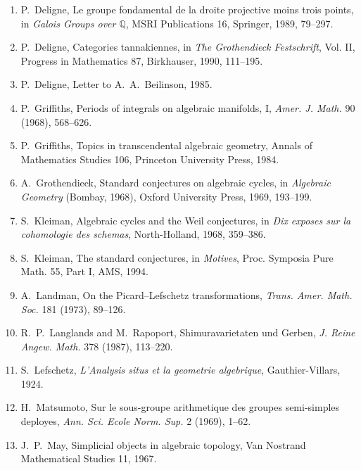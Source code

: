 \documentclass[11pt,a4paper]{article}
\theoremstyle{plain}
\theoremstyle{definition}
\newcommand{\Q}{\mathbb{Q}}
\begin{document}
\begin{enumerate}
\item[{[14]}] P.~Deligne, Le groupe fondamental de la droite projective moins trois points, in \textit{Galois Groups over $\Q$}, MSRI Publications 16, Springer, 1989, 79--297.

\item[{[15]}] P.~Deligne, Categories tannakiennes, in \textit{The Grothendieck Festschrift}, Vol. II, Progress in Mathematics 87, Birkhauser, 1990, 111--195.

\item[{[16]}] P.~Deligne, Letter to A.~A.~Beilinson, 1985.

\item[{[17]}] P.~Griffiths, Periods of integrals on algebraic manifolds, I, \textit{Amer. J. Math.} 90 (1968), 568--626.

\item[{[18]}] P.~Griffiths, Topics in transcendental algebraic geometry, Annals of Mathematics Studies 106, Princeton University Press, 1984.

\item[{[19]}] A.~Grothendieck, Standard conjectures on algebraic cycles, in \textit{Algebraic Geometry} (Bombay, 1968), Oxford University Press, 1969, 193--199.

\item[{[20]}] S.~Kleiman, Algebraic cycles and the Weil conjectures, in \textit{Dix exposes sur la cohomologie des schemas}, North-Holland, 1968, 359--386.

\item[{[21]}] S.~Kleiman, The standard conjectures, in \textit{Motives}, Proc. Symposia Pure Math. 55, Part I, AMS, 1994.

\item[{[22]}] A.~Landman, On the Picard--Lefschetz transformations, \textit{Trans. Amer. Math. Soc.} 181 (1973), 89--126.

\item[{[23]}] R.~P.~Langlands and M.~Rapoport, Shimuravarietaten und Gerben, \textit{J. Reine Angew. Math.} 378 (1987), 113--220.

\item[{[24]}] S.~Lefschetz, \textit{L'Analysis situs et la geometrie algebrique}, Gauthier-Villars, 1924.

\item[{[25]}] H.~Matsumoto, Sur le sous-groupe arithmetique des groupes semi-simples deployes, \textit{Ann. Sci. Ecole Norm. Sup.} 2 (1969), 1--62.

\item[{[26]}] J.~P.~May, Simplicial objects in algebraic topology, Van Nostrand Mathematical Studies 11, 1967.


\end{enumerate}
\end{document}
